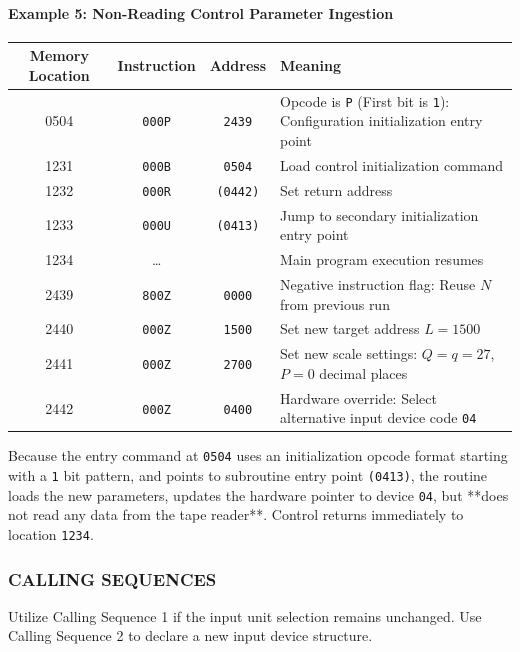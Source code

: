 \paragraph{Example 5: Non-Reading Control Parameter Ingestion}
\begin{table}[h!]
\centering
\begin{tabularx}{\textwidth}{cccX}
\toprule
\textbf{Memory Location} & \textbf{Instruction} & \textbf{Address} & \textbf{Meaning} \\
\midrule
    0504              & \texttt{000P}   & \texttt{2439}    & Opcode is \texttt{P} (First bit is \texttt{1}): Configuration initialization entry point \\
    1231              & \texttt{000B}   & \texttt{0504}    & Load control initialization command \\
    1232              & \texttt{000R}   & \texttt{(0442)}  & Set return address \\
    1233              & \texttt{000U}   & \texttt{(0413)}  & Jump to secondary initialization entry point \\
    1234              & \dots           &                  & Main program execution resumes \\
    \midrule
    2439              & \texttt{800Z}   & \texttt{0000}    & Negative instruction flag: Reuse $N$ from previous run \\
    2440              & \texttt{000Z}   & \texttt{1500}    & Set new target address $L = 1500$ \\
    2441              & \texttt{000Z}   & \texttt{2700}    & Set new scale settings: $Q = q = 27$, $P = 0$ decimal places \\
2442              & \texttt{000Z}   & \texttt{0400}    & Hardware override: Select alternative input device code \texttt{04} \\
\bottomrule
\end{tabularx}
\end{table}
Because the entry command at \texttt{0504} uses an initialization opcode format starting with a \texttt{1} bit pattern, and points to subroutine entry point \texttt{(0413)}, the routine loads the new parameters, updates the hardware pointer to device \texttt{04}, but **does not read any data from the tape reader**. Control returns immediately to location \texttt{1234}.

\subsubsection*{CALLING SEQUENCES}
Utilize Calling Sequence 1 if the input unit selection remains unchanged. Use Calling Sequence 2 to declare a new input device structure.

